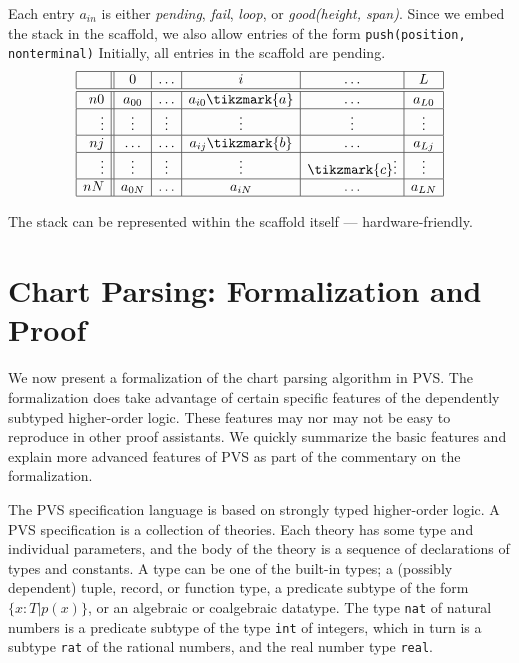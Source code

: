 \documentclass[sigplan,10pt,anonymous,review]{acmart}\settopmatter{printfolios=true,printccs=false,printacmref=false}
\begin{document}
\begin{CCSXML}
Each entry $a_{in}$ is either \textit{pending}, \textit{fail}, \textit{loop}, or \textit{good(height, span)}.  Since we embed the stack in the scaffold,
we also allow entries of the form \texttt{push(position, nonterminal)}
Initially, all entries in the scaffold are pending.  
$$
\begin{array}{|r||c|c|c|c|c|}\hline
  & 0 & \ldots & i & \ldots & L \\\hline\hline
  n0 & a_{00}& \ldots & a_{i0}\tikzmark{a} & \ldots & a_{L0}\\\hline
  \vdots & \vdots & \vdots & \vdots & \vdots & \vdots\\\hline
  nj & \ldots & \ldots & a_{ij}\tikzmark{b} & \ldots & a_{Lj}\\\hline
  \vdots & \vdots & \vdots & \vdots & \tikzmark{c}\vdots & \vdots\\\hline  
  nN & a_{0N}& \ldots & a_{iN} & \ldots & a_{LN}\\\hline
\end{array}
$$
The stack can be represented within the scaffold itself --- hardware-friendly. 









\section{Chart Parsing: Formalization and Proof}

We now present a formalization of the chart parsing algorithm in PVS.
The formalization does take advantage of certain specific features of
the dependently subtyped higher-order logic.  These features
may nor may not be easy to reproduce in other proof assistants.
We quickly summarize the basic features and 
explain more advanced  features of PVS as part of the commentary on the
formalization.

The PVS specification language is based on strongly typed higher-order logic.  
A PVS specification is a collection of theories.  Each theory has
some type and individual parameters, and the body of the theory is a sequence
of declarations of types and constants.  A type can be one of the built-in
types; a (possibly dependent) tuple, record, or function type, a predicate
subtype of the form $\{x: T | p(x)\}$, or an algebraic or coalgebraic datatype.
The type \texttt{nat} of natural numbers is a predicate subtype of the
type \texttt{int} of integers, which in turn is a subtype \texttt{rat} of the
rational numbers, and the real number type \texttt{real}\@.


\end{CCSXML}
\end{document}
